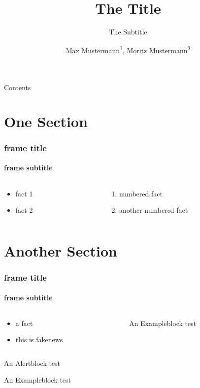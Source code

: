 \documentclass[aspectratio=169]{beamer}
\title[Short Title]{The Title}
\subtitle[subtitle]{The Subtitle}
\author[Short Name]{Max Mustermann\textsuperscript{1}, Moritz Mustermann\textsuperscript{2} }
\institute{\textsuperscript{1}Institute of Microwave Systems, \textsuperscript{2}Another Institute}
\begin{document}
\begin{frame}[plain]
  \titlepage
\end{frame}

\begin{frame}{Contents}
  \tableofcontents
\end{frame}


\section{One Section}
\begin{frame}
  \frametitle{frame title}
  \framesubtitle{frame subtitle}
  \begin{columns}
    \begin{column}{0.46 \textwidth}
      \begin{itemize}
        \item fact 1
        \item fact 2
      \end{itemize}
    \end{column}
    \begin{column}{0.46 \textwidth}
      \begin{enumerate}
        \item numbered fact
        \item another numbered fact
      \end{enumerate}
    \end{column}    
  \end{columns}
\end{frame}

\section{Another Section}
\begin{frame}
  \frametitle{frame title}
  \framesubtitle{frame subtitle}
  \begin{columns}
    \begin{column}{0.46 \textwidth}
      \begin{itemize}
        \item a fact
        \item this is fakenews
      \end{itemize}
    \end{column}
    \begin{column}{0.46 \textwidth}
      \begin{block}{An Exampleblock}
        test
      \end{block}
    \end{column}
  \end{columns}
  \begin{alertblock}{An Alertblock}
    test
  \end{alertblock}
  \begin{exampleblock}{An Exampleblock}
    test
  \end{exampleblock}
\end{frame}
\end{document}

